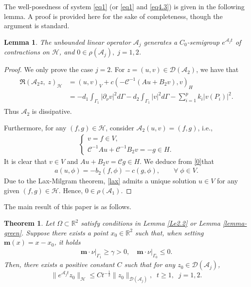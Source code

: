 \documentclass[twoside]{article}
\newtheorem{lemma}[definition]{Lemma}
\newtheorem{theorem}[definition]{Theorem}
\theoremstyle{noparens}
\theoremstyle{definition}
\numberwithin{equation}{section}
\numberwithin{figure}{section}
\begin{document}
The well-posedness of system \eqref{eq1} (or \eqref{eq1} and \eqref{eq4.3})  is given in the following lemma. A proof is provided here for the sake of completeness, though the argument is standard.


\begin{lemma}\label{well}
	The unbounded linear operator $\mathcal{A}_j$ generates a $C_0$-semigroup $e^{\mathcal{A}_j t}$ of contractions on $\mathcal{H} $, and $0\in\rho(\mathcal{A}_j), \; j=1,2$.
\end{lemma}
\begin{proof} We only prove the case $j=2$.
	For $z=(u,v)\in \mathcal{D}(\mathcal{A}_2)$, we have that
	\begin{align}\label{haosan}
		\begin{split}
			\Re(\mathcal{A}_2 z,\; z)_{\mathcal{H} } &= (u,v)_{V} + c (-\mathcal C^{-1}(A u + B_2 v), v)_{H} \\
			& = - d_1\int_{\Gamma_1}|\partial_{\nu} v|^2 d\Gamma - d_2 \int_{\Gamma_1}|v|^2 d\Gamma - \sum_{i=1}^p k_i  |v(P_i)|^2.
		\end{split}
	\end{align}
	Thus $\mathcal{A}_2$ is dissipative.
	
	Furthermore, for any $(f,g)\in \mathcal H$, consider  $\mathcal A_2(u,v)=(f,g)$, i.e.,
	\begin{align}\label{0}
		\begin{cases}
			v = f \in V,\\
			\mathcal C ^{-1}A u + \mathcal C^{-1}B_2 v = -g\in H.
		\end{cases}
	\end{align}
	It is clear that $v\in V$ and $A u + B_2 v = \mathcal C g\in H$.
	We deduce from \eqref{0}that
	\begin{align}\label{lax}
		a(u,\phi) = - b_2(f,\phi) - c(g,\phi),\qquad\forall\;\phi\in V.
	\end{align}
	Due to the Lax-Milgram theorem, \eqref{lax} admits a unique solution $u\in V$ for any
	given $(f,g)\in\mathcal H$.
	Hence, $0\in\rho(\mathcal{A}_1)$.
\end{proof}

\medskip
The main result of this paper is as follows.
\begin{theorem}\label{Th1}
	Let $\Omega\subset\mathbb{R}^2$ satisfy conditions in Lemma \ref{Le2.2} or  Lemma \ref{lemma-green}.   Suppose   there exists a point $x_0 \in \mathbb{R}^{2}$  such that, when setting $\mathbf{m} (x)=x-x_0$, it holds
	\begin{align}\label{assume-c}
		\mathbf{m} \cdot \nu \big|_{\Gamma_1} \geq \gamma >0,  \quad
		\mathbf{m} \cdot \nu\big|_{\Gamma_0} \leq 0.
		\tag{\bf H}\end{align}
	Then, there exists a positive constant $C$ such that for any $z_0\in\mathcal{D}(\mathcal{A}_j)$,
	$$
	\|e^{\mathcal{A}_j t}z_0\|_{\mathcal{H} }\leq Ct^{-{\frac{1}{2}}}
	\|z_0\|_{\mathcal{D}(\mathcal{A}_j)},\;\; t\geq 1 ,\;\;j=1,2.
	$$
\end{theorem}
\end{document}
